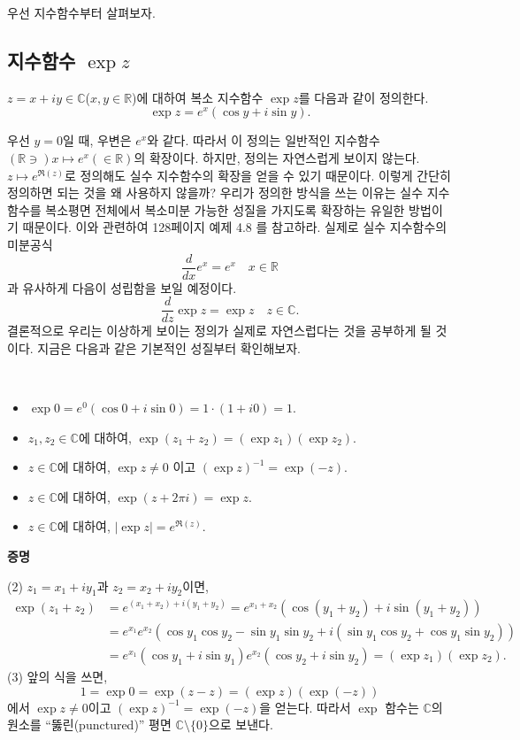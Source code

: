 우선  지수함수부터 살펴보자.

\subsection{지수함수 $\exp z$}

\begin{salt_definition}[복소 지수함수] \label{def-1-2}
$z=x+iy\in \mathbb C$($x,y\in\mathbb R$)에 대하여
복소 지수함수 $\exp z$를 다음과 같이 정의한다.
$$
\exp z = e^x(\cos y +i\sin y).
$$
\end{salt_definition}

우선 $y=0$일 때, 우변은 $e^x$와 같다. 따라서 이 정의는
일반적인 지수함수 $(\mathbb R \ni) x \mapsto e^x (\in \mathbb R)$의 확장이다.
하지만, 정의는 자연스럽게 보이지 않는다. 
$z\mapsto e^{\Re(z)}$로 정의해도 실수 지수함수의 확장을 얻을 수 있기 때문이다.
이렇게 간단히 정의하면 되는 것을 왜 사용하지 않을까?
우리가 정의한 방식을 쓰는 이유는
실수 지수함수를 복소평면 전체에서 복소미분 가능한 성질을 가지도록
확장하는 유일한 방법이기 때문이다. 
이와 관련하여 
128페이지 %
예제 4.8 %
를 참고하라.
실제로 실수 지수함수의 미분공식
$$
\dfrac{d}{dx}e^x  = e^x \quad x\in\mathbb R
$$
과 유사하게 다음이 성립함을 보일 예정이다.
$$
\dfrac{d}{dz} \exp z  = \exp z \quad z\in\mathbb C.
$$
결론적으로 우리는 이상하게 보이는 정의가 실제로 자연스럽다는 것을 공부하게 될 것이다.
지금은 다음과 같은 기본적인 성질부터 확인해보자.

\begin{salt_prop} \label{prop-1-2}
\
\begin{itemize}
\item[(1)] $\exp 0 = e^0(\cos 0 + i\sin 0) = 1\cdot(1+i0) = 1$.
\item[(2)] $z_1, z_2\in \mathbb C$에 대하여, $\exp(z_1+z_2) = (\exp z_1)(\exp z_2)$.
\item[(3)] $z \in \mathbb C$에 대하여, $\exp z \ne 0$ 이고 $(\exp z)^{-1} = \exp (-z)$.
\item[(4)] $z \in \mathbb C$에 대하여, $\exp(z+2\pi i) = \exp z$.
\item[(5)] $z \in \mathbb C$에 대하여, $|\exp z| = e^{\Re(z)}$.
\end{itemize}
\end{salt_prop}

{\bf 증명}

\noindent
(2)  $z_1 = x_1 + iy_1$과 $z_2 = x_2 + iy_2$이면,
\begin{align*}
\exp(z_1+z_2)
&= e^{(x_1+x_2) + i(y_1+y_2)} = e^{x_1+x_2}
\left( \cos(y_1+y_2) + i\sin(y_1+y_2) \right) \\
&= e^{x_1}e^{x_2} \left( \cos y_1 \cos y_2 - \sin y_1\sin y_2
+ i(\sin y_1\cos y_2 + \cos y_1\sin y_2) \right) \\
&= e^{x_1} (\cos y_1 + i\sin y_1)  e^{x_2} (\cos y_2 + i\sin y_2)  
= (\exp z_1)(\exp z_2).
\end{align*}
(3) 앞의 식을 쓰면,
$$
1  = \exp 0 = \exp (z-z) = (\exp z)(\exp (-z))
$$
에서 $\exp z \ne 0$이고 $(\exp z)^{-1} = \exp(-z)$을 얻는다.
따라서 $\exp$ 함수는 $\mathbb C$의 원소를 
``뚫린(punctured)'' 평면 $\mathbb C\setminus \{0\}$으로 보낸다.

